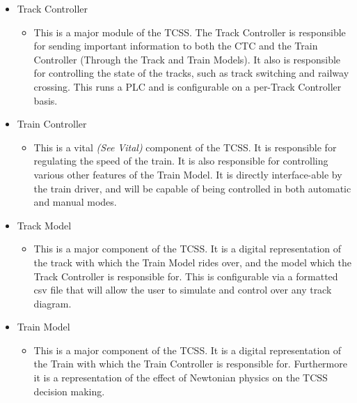 \documentclass{article}
\begin{document}
\begin{itemize}
        \item Track Controller 
            \begin{itemize}
            \item This is a major module of the TCSS. The Track Controller  is responsible for sending important information to both the CTC  and the Train Controller  (Through the Track and Train Models). It also is responsible for controlling the state of the tracks, such as track switching and railway crossing. This runs a PLC  and is configurable on a per-Track Controller  basis.
            \end{itemize}
        \item Train Controller 
            \begin{itemize}
            \item This is a vital  \emph{(See Vital)} component of the TCSS. It is responsible for regulating the speed of the train. It is also responsible for controlling various other features of the Train Model. It is directly interface-able by the train driver, and will be capable of being controlled in both automatic and manual modes. 
            \end{itemize}
        \item Track Model 
            \begin{itemize}
            \item This is a major component of the TCSS. It is a digital representation of the track with which the Train Model rides over, and the model which the Track Controller  is responsible for. This is configurable via a formatted csv file that will allow the user to simulate and control over any track diagram.
            \end{itemize}
        \item Train Model
            \begin{itemize}
            \item This is a major component of the TCSS. It is a digital representation of the Train with which the Train Controller  is responsible for. Furthermore it is a representation of the effect of Newtonian physics on the TCSS decision making.
            \end{itemize}

\end{itemize}
\end{document}
